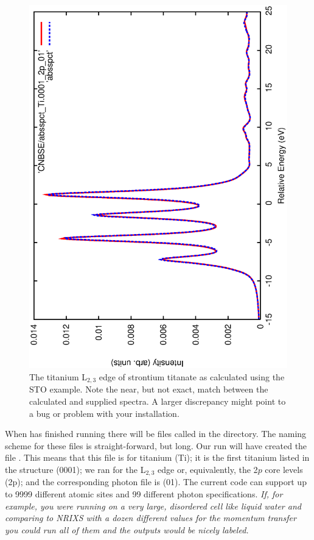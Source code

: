 \documentclass[11pt]{report}
\begin{document}
\begin{figure}
\center
\includegraphics[angle=270,width=4.5in]{sto_compare.eps}
\caption{ The titanium L$_{2,3}$ edge of strontium titanate as calculated using the STO example. Note the near, but not exact, match between the calculated and supplied spectra. A larger discrepancy might point to a bug or problem with your installation. }
\label{STO_plot}
\end{figure}


When  has finished running there will be files called  in the  directory. The naming scheme for these files is straight-forward, but long. Our run will have created the file . This means that this  file is for titanium (Ti); it is the first titanium listed in the structure (0001); we ran for the L$_{2,3}$ edge or, equivalently, the 2$p$ core levels (2p); and the corresponding photon file is  (01). The current  code can support up to 9999 different atomic sites and 99 different photon specifications. {\it If, for example, you were running on a very large, disordered cell like liquid water and comparing to NRIXS with a dozen different values for the momentum transfer you could run all of them and the outputs would be nicely labeled.}
\end{document}

